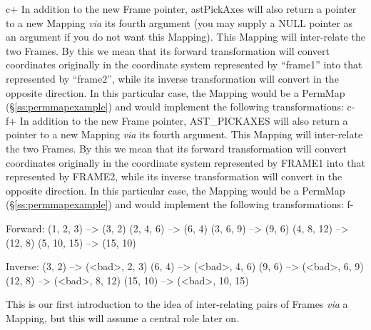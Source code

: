 \documentclass[twoside,11pt]{starlink}
\providecommand{\secref}[1]{\S\ref{#1}}
\begin{document}
c+
In addition to the new Frame pointer, astPickAxes will also return a
pointer to a new Mapping \emph{via} its fourth argument (you may supply a
NULL pointer as an argument if you do not want this Mapping).  This
Mapping will inter-relate the two Frames. By this we mean that its
forward transformation will convert coordinates originally in the
coordinate system represented by ``frame1'' into that represented by
``frame2'', while its inverse transformation will convert in the
opposite direction. In this particular case, the Mapping would be a
PermMap (\secref{ss:permmapexample}) and would implement the following
transformations:
c-
f+
In addition to the new Frame pointer, AST\_PICKAXES will also return a
pointer to a new Mapping \emph{via} its fourth argument. This Mapping will
inter-relate the two Frames. By this we mean that its forward
transformation will convert coordinates originally in the coordinate
system represented by FRAME1 into that represented by FRAME2, while
its inverse transformation will convert in the opposite direction. In
this particular case, the Mapping would be a PermMap
(\secref{ss:permmapexample}) and would implement the following
transformations:
f-

\begin{terminalv}
Forward:
   (1, 2, 3) --> (3, 2)
   (2, 4, 6) --> (6, 4)
   (3, 6, 9) --> (9, 6)
   (4, 8, 12) --> (12, 8)
   (5, 10, 15) --> (15, 10)

Inverse:
   (3, 2) --> (<bad>, 2, 3)
   (6, 4) --> (<bad>, 4, 6)
   (9, 6) --> (<bad>, 6, 9)
   (12, 8) --> (<bad>, 8, 12)
   (15, 10) --> (<bad>, 10, 15)
\end{terminalv}

This is our first introduction to the idea of inter-relating pairs of
Frames \emph{via} a Mapping, but this will assume a central role later on.
\end{document}
